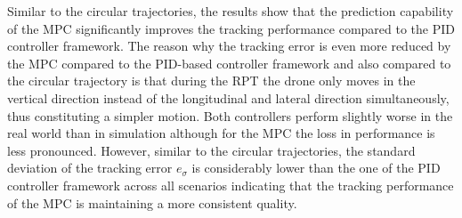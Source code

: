 Similar to the circular trajectories, the results show that the prediction capability of the MPC  significantly improves the tracking performance compared to the PID controller framework. The reason why the tracking error is even more reduced by the MPC compared to the PID-based controller framework and also compared to the circular trajectory is that during the RPT the drone only moves in the vertical direction instead of the  longitudinal and lateral direction simultaneously, thus constituting a simpler motion. Both controllers perform slightly worse in the real world than in simulation although for the MPC the loss in performance is less pronounced. However, similar to the circular trajectories, the standard deviation of the tracking error $e_{\sigma}$ is considerably lower than the one of the PID controller framework across all scenarios indicating that the tracking performance of the MPC is maintaining a  more consistent quality.














